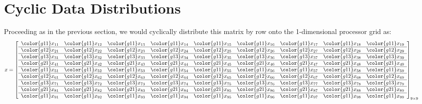 \section{Cyclic Data Distributions}

Proceeding as in the previous section, we would cyclically distribute this matrix by row onto the 1-dimensional processor grid as:
\begin{align*}
x &= \left[
      \begin{array}{lllllllll}
      \color{g11}x_{11} & \color{g11}x_{12} & \color{g11}x_{13} & \color{g11}x_{14} & \color{g11}x_{15} & \color{g11}x_{16} & \color{g11}x_{17} & \color{g11}x_{18} & \color{g11}x_{19}\\\hline
      \color{g12}x_{21} & \color{g12}x_{22} & \color{g12}x_{23} & \color{g12}x_{24} & \color{g12}x_{25} & \color{g12}x_{26} & \color{g12}x_{27} & \color{g12}x_{28} & \color{g12}x_{29}\\\hline
      \color{g13}x_{31} & \color{g13}x_{32} & \color{g13}x_{33} & \color{g13}x_{34} & \color{g13}x_{35} & \color{g13}x_{36} & \color{g13}x_{37} & \color{g13}x_{38} & \color{g13}x_{39}\\\hline
      \color{g21}x_{41} & \color{g21}x_{42} & \color{g21}x_{43} & \color{g21}x_{44} & \color{g21}x_{45} & \color{g21}x_{46} & \color{g21}x_{47} & \color{g21}x_{48} & \color{g21}x_{49}\\\hline
      \color{g11}x_{51} & \color{g11}x_{52} & \color{g11}x_{53} & \color{g11}x_{54} & \color{g11}x_{55} & \color{g11}x_{56} & \color{g11}x_{57} & \color{g11}x_{58} & \color{g11}x_{59}\\\hline
      \color{g12}x_{61} & \color{g12}x_{62} & \color{g12}x_{63} & \color{g12}x_{64} & \color{g12}x_{65} & \color{g12}x_{66} & \color{g12}x_{67} & \color{g12}x_{68} & \color{g12}x_{69}\\\hline
      \color{g13}x_{71} & \color{g13}x_{72} & \color{g13}x_{73} & \color{g13}x_{74} & \color{g13}x_{75} & \color{g13}x_{76} & \color{g13}x_{77} & \color{g13}x_{78} & \color{g13}x_{79}\\\hline
      \color{g21}x_{81} & \color{g21}x_{82} & \color{g21}x_{83} & \color{g21}x_{84} & \color{g21}x_{85} & \color{g21}x_{86} & \color{g21}x_{87} & \color{g21}x_{88} & \color{g21}x_{89}\\\hline
      \color{g11}x_{91} & \color{g11}x_{92} & \color{g11}x_{93} & \color{g11}x_{94} & \color{g11}x_{95} & \color{g11}x_{96} & \color{g11}x_{97} & \color{g11}x_{98} & \color{g11}x_{99}\\
      \end{array}
\right]_{9\times 9}
\end{align*}
